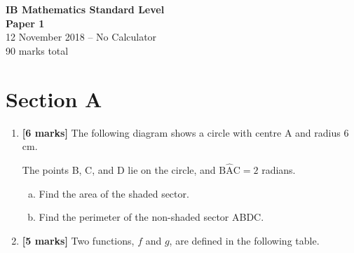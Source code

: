 \documentclass[12pt, twoside]{article}
\begin{document}
\begin{center}
\Large{\textbf{IB Mathematics Standard Level}} \\
\large{\textbf{Paper 1}} \\
\normalsize{12 November 2018 -- No Calculator} \\
\normalsize{90 marks total}
\end{center}

\vspace{0.5cm}

\section*{Section A}

\begin{enumerate}

\item \textbf{[6 marks]} The following diagram shows a circle with centre A and radius 6\,cm.

\begin{center}
\end{center}

The points B, C, and D lie on the circle, and $\mathrm{B\hat{A}C} = 2$ radians.

\begin{enumerate}[(a)]
    \item Find the area of the shaded sector.
    \item Find the perimeter of the non-shaded sector ABDC.
\end{enumerate}

\vspace{1cm}

\item \textbf{[5 marks]} Two functions, $f$ and $g$, are defined in the following table.


\end{enumerate}
\end{document}
